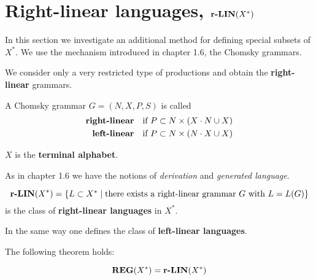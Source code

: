 \section{Right-linear languages, \texorpdfstring{$\mbox{{\bf r-LIN}}(X^*)$}{r-LIN(X*)}}

In this section we investigate an additional method for defining special subsets
of $X^*$. We use the mechanism introduced in chapter 1.6, the Chomsky grammars.

We consider only a very restricted type of productions and obtain the {\bf
right-linear} grammars.

\begin{definition}
A Chomsky grammar $G = (N, X, P, S)$ is called
\begin{eqnarray*}
\text{\bf right-linear} & & \text{if } P \subset N \times (X \cdot N \cup X) \\
\text{\bf left-linear}  & & \text{if } P \subset N \times (N \cdot X \cup X)
\end{eqnarray*}
\end{definition}

$X$ is the {\bf terminal alphabet}.

As in chapter 1.6 we have the notions of {\em derivation} and {\em generated
language}.

\begin{definition}
\[ \mbox{{\bf r-LIN}}(X^*) = \mbox{$\{L \subset X^* \mid \text{there exists a right-linear
grammar $G$ with } L = L(G)\}$} \]
is the class of {\bf right-linear languages} in $X^*$.
\end{definition}

In the same way one defines the class of {\bf left-linear languages}.

The following theorem holds:

\begin{theorem}
\[ \mbox{{\bf REG}}(X^*) = \mbox{{\bf r-LIN}}(X^*) \]
\end{theorem}

